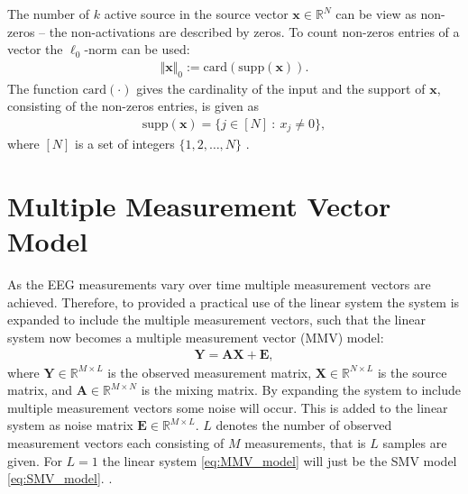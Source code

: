 The number of $k$ active source in the source vector $\mathbf{x} \in \mathbb{R}^N$ can be view as non-zeros -- the non-activations are described by zeros. To count non-zeros entries of a vector the $\ell_0$-norm can be used:
\begin{align*}
\Vert \mathbf{x} \Vert_0 := \text{card}(\text{supp}(\mathbf{x})).
\end{align*}
The function $\text{card}(\cdot)$ gives the cardinality of the input and the support of $\mathbf{x}$, consisting of the non-zeros entries, is given as
\begin{align*}
\text{supp}(\mathbf{x}) = \{ j \in [N] \ : \ x_j \neq 0 \},
\end{align*} 
where $[N]$ is a set of integers $\lbrace 1, 2, \hdots, N \rbrace$ \cite[p. 41]{FR}. 


\section{Multiple Measurement Vector Model}\label{sec:MMV}
As the EEG measurements vary over time multiple measurement vectors are achieved. Therefore, to provided a practical use of the linear system the system is expanded to include the multiple measurement vectors, such that the linear system now becomes a multiple measurement vector (MMV) model:
\begin{align}\label{eq:MMV_model}
\mathbf{Y} = \mathbf{AX}+\textbf{E},
\end{align}
where $\mathbf{Y} \in \mathbb{R}^{M \times L}$ is the observed measurement matrix, $\mathbf{X} \in \mathbb{R}^{N \times L}$ is the source matrix, and $\mathbf{A} \in \mathbb{R}^{M \times N}$ is the mixing matrix. By expanding the system to include multiple measurement vectors some noise will occur. This is added to the linear system as noise matrix $\textbf{E} \in \mathbb{R}^{M \times L}$. $L$ denotes the number of observed measurement vectors each consisting of $M$ measurements, that is $L$ samples are given. For $L = 1$ the linear system \eqref{eq:MMV_model} will just be the SMV model \eqref{eq:SMV_model}. .

